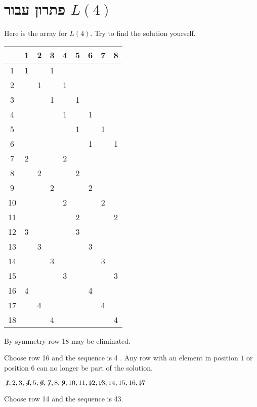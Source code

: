 
\section{פתרון עבור
$L(4)$}\label{s.langford-four}

Here is the array for $L(4)$. Try to find the solution yourself.
\begin{center}
\addtolength{\tabcolsep}{4pt}
\begin{tabular}{|c||c|c|c|c|c|c|c|c|}
\hline
&1&2&3&4&5&6&7&8\\\hline\hline
1&1&&1&&&&&\\\hline
2&&1&&1&&&&\\\hline
3&&&1&&1&&&\\\hline
4&&&&1&&1&&\\\hline
5&&&&&1&&1&\\\hline
6&&&&&&1&&1\\\hline
7&2&&&2&&&&\\\hline
8&&2&&&2&&&\\\hline
9&&&2&&&2&&\\\hline
10&&&&2&&&2&\\\hline
11&&&&&2&&&2\\\hline
12&3&&&&3&&&\\\hline
13&&3&&&&3&&\\\hline
14&&&3&&&&3&\\\hline
15&&&&3&&&&3\\\hline
16&4&&&&&4&&\\\hline
17&&4&&&&&4&\\\hline
18&&&4&&&&&4\\\hline
\end{tabular}
\end{center}
By symmetry row 18 may be eliminated.

\smallskip

\noindent Choose row 16 and the sequence is 4\textvisiblespace\textvisiblespace\textvisiblespace{} \textvisiblespace\textvisiblespace.
Any row with an element in position $1$ or position $6$ can no longer be part of the solution.

$\not\! 1,2,3,\not\! 4,5,\not\! 6,\not\! 7,8,\not\! 9,10,11,\not\!\! 12,\not\!\! 13,14,15,16,\not\!\! 17$

\noindent Choose row 14 and the sequence is 4\textvisiblespace{}3\textvisiblespace.

